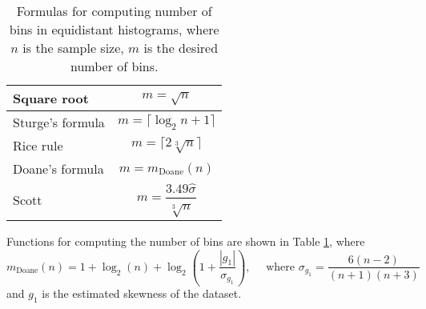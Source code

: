 \begin{table}[ht]
\centering
\begin{tabular}{|l | c|}
\hline 
\rule{0pt}{2.4ex} Square root & {$ m = \sqrt{n}$} \\%
\hline 
\rule{0pt}{2.4ex} Sturge's formula \cite{Sturges1926} &$ m = \lceil\log_2 n + 1\rceil$ \\ %
\hline
\rule{0pt}{2.4ex} Rice rule \cite{RiceRule}&  $m = \lceil 2 \sqrt[3]{n}\rceil$ \\ %
\hline
\rule{0pt}{2.4ex} Doane's formula \cite{Doane1976} &  $m =  m_{\mathrm{Doane}}(n)$ \\
\hline
\rule{0pt}{4ex} Scott \cite{Scott1979} &  $m = \dfrac{3.49 \hat{\sigma}}{\sqrt[3]{n}}$ \\
\hline
\end{tabular} 
\caption{Formulas for computing number of bins in equidistant histograms, where $n$ is the sample size, $m$ is the desired number of bins.}
\label{tab:histNbin}
\end{table}

\noindent Functions for computing the number of bins are shown in Table \ref{tab:histNbin}, where \[ m_{\mathrm{Doane}}(n) = 1 + \log_2 (n) + \log_2 \left( 1 + \dfrac{|g_1|}{\sigma_{g_1}} \right), \quad   \text{ where } \sigma_{g_1} = \frac{6(n-2)}{(n+1)(n+3)}\] and $g_1$ is the estimated skewness of the dataset. 

